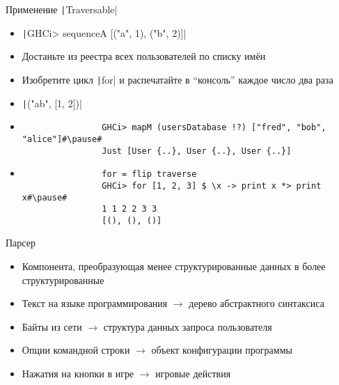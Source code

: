     \begin{frame}[fragile]{Применение \texttt|Traversable|}
        \begin{itemize}
            \item[\todo] \texttt|GHCi> sequenceA [("a", 1), ("b", 2)]|
            \item[\todo] Достаньте из реестра всех пользователей по списку имён
            \item[\todo] Изобретите цикл \texttt|for| и распечатайте в ``консоль'' каждое число два раза
            \item[\answer] \pause \texttt|("ab", [1, 2])|
            \item[\answer] \pause
            \begin{verbatim}
                GHCi> mapM (usersDatabase !?) ["fred", "bob", "alice"]#\pause#
                Just [User {..}, User {..}, User {..}]
            \end{verbatim}
            \item[\answer] \pause
            \begin{verbatim}
                for = flip traverse
                GHCi> for [1, 2, 3] $ \x -> print x *> print x#\pause#
                1 1 2 2 3 3
                [(), (), ()]
            \end{verbatim}
        \end{itemize}
    \end{frame}


    \begin{frame}[fragile]{Парсер}
        \vspace{-0.5em}
        \begin{itemize}
            \item[\defi] Компонента, преобразующая менее структурированные данных в более структурированные
            \item[\eg] Текст на языке программирования $\to$ дерево абстрактного синтаксиса
            \item[\eg] Байты из сети $\to$ структура данных запроса пользователя
            \item[\eg] Опции командной строки $\to$ объект конфигурации программы
            \item[\eg] Нажатия на кнопки в игре $\to$ игровые действия
        \end{itemize}
    \end{frame}


